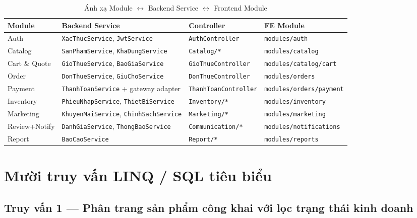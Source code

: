 \begin{table}[H]
\centering
\caption{Ánh xạ Module $\leftrightarrow$ Backend Service $\leftrightarrow$ Frontend Module}
\label{tab:module_mapping}
\begin{tabularx}{\textwidth}{|l|X|X|l|}
\hline
\textbf{Module} & \textbf{Backend Service} & \textbf{Controller} & \textbf{FE Module} \\ \hline
Auth           & \texttt{XacThucService}, \texttt{JwtService} & \texttt{AuthController} & \texttt{modules/auth} \\ \hline
Catalog        & \texttt{SanPhamService}, \texttt{KhaDungService} & \texttt{Catalog/*} & \texttt{modules/catalog} \\ \hline
Cart \& Quote  & \texttt{GioThueService}, \texttt{BaoGiaService} & \texttt{GioThueController} & \texttt{modules/catalog/cart} \\ \hline
Order          & \texttt{DonThueService}, \texttt{GiuChoService} & \texttt{DonThueController} & \texttt{modules/orders} \\ \hline
Payment        & \texttt{ThanhToanService} + gateway adapter & \texttt{ThanhToanController} & \texttt{modules/orders/payment} \\ \hline
Inventory      & \texttt{PhieuNhapService}, \texttt{ThietBiService} & \texttt{Inventory/*} & \texttt{modules/inventory} \\ \hline
Marketing      & \texttt{KhuyenMaiService}, \texttt{ChinhSachService} & \texttt{Marketing/*} & \texttt{modules/marketing} \\ \hline
Review+Notify  & \texttt{DanhGiaService}, \texttt{ThongBaoService} & \texttt{Communication/*} & \texttt{modules/notifications} \\ \hline
Report         & \texttt{BaoCaoService} & \texttt{Report/*} & \texttt{modules/reports} \\ \hline
\end{tabularx}
\end{table}

\section{Mười truy vấn LINQ / SQL tiêu biểu}
\label{sec:queries}

\subsection{Truy vấn 1 --- Phân trang sản phẩm công khai với lọc trạng thái kinh doanh}

